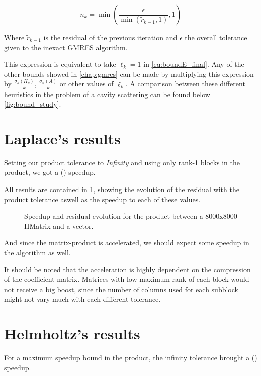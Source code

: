 \begin{equation}
    n_{k} = \min \left(\frac{\epsilon}{\min(\tilde{r}_{k-1},1)},1 \right)
\end{equation}

Where $\tilde{r}_{k-1}$ is the residual of the previous iteration and $\epsilon$ the overall tolerance given to the inexact GMRES algorithm.

This expression is equivalent to take $\ell_{k} = 1$ in \autoref{eq:boundE_final}. Any of the other bounds showed in \autoref{chap:gmres} can be made by multiplying this expression by $\frac{\sigma_{k}(H_{k})}{k}$, $\frac{\sigma_{n}(A)}{k}$ or other values of $\ell_{k}$. A comparison between these different heuristics in the problem of a cavity scattering can be found below \ref{fig:bound_study}.

\section{Laplace's results}

Setting our product tolerance to \textit{Infinity} and using only rank-1 blocks in the product, we got a () speedup.

All results are contained in \ref{fig:laplace_results}, showing the evolution of the residual with the product tolerance aswell as the speedup to each of these values.

\begin{figure}[h!]
    \centering
    
    \caption{Speedup and residual evolution for the product between a 8000x8000 HMatrix and a vector.}
    \label{fig:laplace_results}
\end{figure}

And since the matrix-product is accelerated, we should expect some speedup in the algorithm as well.

It should be noted that the acceleration is highly dependent on the compression of the coefficient matrix. Matrices with low maximum rank of each block would not receive a big boost, since the number of columns used for each subblock might not vary much with each different tolerance.

\section{Helmholtz's results}
For a maximum speedup bound in the product, the infinity tolerance brought a () speedup.

